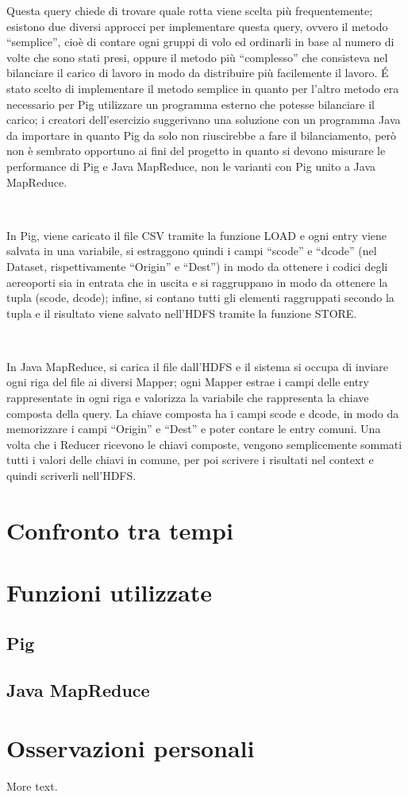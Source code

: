 \documentclass[11pt]{article} %
\begin{document}
Questa query chiede di trovare quale rotta viene scelta più frequentemente; esistono due diversi approcci per implementare questa query, ovvero il metodo ``semplice'', cioè di contare ogni gruppi di volo ed ordinarli in base al numero di volte che sono stati presi, oppure il metodo più ``complesso'' che consisteva nel bilanciare il carico di lavoro in modo da distribuire più facilemente il lavoro. \'E stato scelto di implementare il metodo semplice in quanto per l'altro metodo era necessario per Pig utilizzare un programma esterno che potesse bilanciare il carico; i creatori dell'esercizio suggerivano una soluzione con un programma Java da importare in quanto Pig da solo non riuscirebbe a fare il bilanciamento, però non è sembrato opportuno ai fini del progetto in quanto si devono misurare le performance di Pig e Java MapReduce, non le varianti con Pig unito a Java MapReduce.

~

In Pig, viene caricato il file CSV tramite la funzione LOAD e ogni entry viene salvata in una variabile, si estraggono quindi i campi ``scode'' e ``dcode'' (nel Dataset, rispettivamente ``Origin'' e ``Dest'') in modo da ottenere i codici degli aereoporti sia in entrata che in uscita e si raggruppano in modo da ottenere la tupla (scode, dcode); infine, si contano tutti gli elementi raggruppati secondo la tupla e il risultato viene salvato nell'HDFS tramite la funzione STORE.

~

In Java MapReduce, si carica il file dall'HDFS e il sistema si occupa di inviare ogni riga del file ai diversi Mapper; ogni Mapper estrae i campi delle entry rappresentate in ogni riga e valorizza la variabile che rappresenta la chiave composta della query. La chiave composta ha i campi scode e dcode, in modo da memorizzare i campi ``Origin'' e ``Dest'' e poter contare le entry comuni. Una volta che i Reducer ricevono le chiavi composte, vengono semplicemente sommati tutti i valori delle chiavi in comune, per poi scrivere i risultati nel context e quindi scriverli nell'HDFS.


\section{Confronto tra tempi}

\section{Funzioni utilizzate}
\subsection{Pig}
\subsection{Java MapReduce}

\section{Osservazioni personali}

More text.
\end{document}
